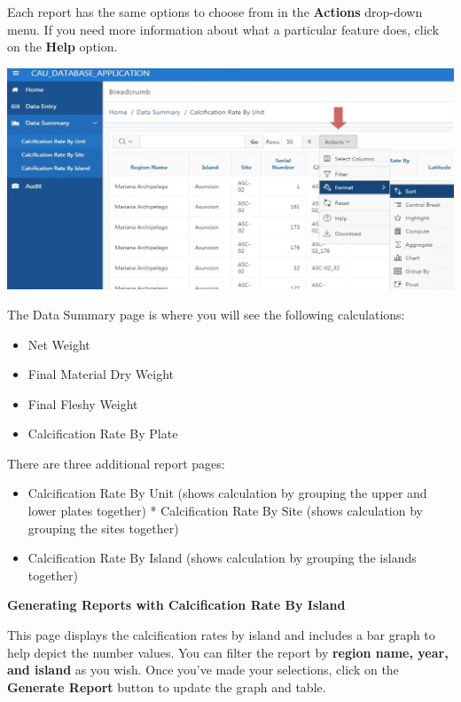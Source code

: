\documentclass[]{book}
\providecommand{\tightlist}{%
  \setlength{\itemsep}{0pt}\setlength{\parskip}{0pt}}
\begin{document}
Each report has the same options to choose from in the \textbf{Actions} drop-down menu. If you need more information about what a particular feature does, click on the \textbf{Help} option.

\includegraphics{images/Data7.jpg}

The Data Summary page is where you will see the following calculations:

\begin{itemize}
\tightlist
\item
  Net Weight\\
\item
  Final Material Dry Weight\\
\item
  Final Fleshy Weight\\
\item
  Calcification Rate By Plate
\end{itemize}

There are three additional report pages:

\begin{itemize}
\tightlist
\item
  Calcification Rate By Unit (shows calculation by grouping the upper and lower plates together) * Calcification Rate By Site (shows calculation by grouping the sites together)\\
\item
  Calcification Rate By Island (shows calculation by grouping the islands together)
\end{itemize}

\textbf{Generating Reports with Calcification Rate By Island}

This page displays the calcification rates by island and includes a bar graph to help depict the number values. You can filter the report by \textbf{region name, year, and island} as you wish. Once you've made your selections, click on the \textbf{Generate Report} button to update the graph and table.
\end{document}
